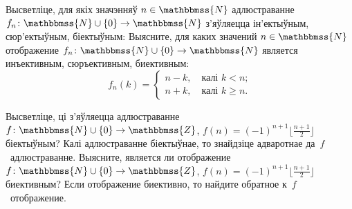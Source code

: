 \begin{problemList}
\bigskip

\problemItemWithCommonPart
{Высветліце, для якіх значэнняў $n \in \mathbbmss{N}$ адлюстраванне
$f_n \colon \mathbbmss{N} \cup \{0\} \to \mathbbmss{N}$ з'яўляецца ін'ектыўным, сюр'ектыўным, біектыўным:}
{Выясните, для каких значений $n \in \mathbbmss{N}$ отображение
$f_n \colon \mathbbmss{N} \cup \{0\} \to \mathbbmss{N}$ является инъективным, сюръективным, биективным:}
{%
\begin{equation*}
    f_n(k) =
    \begin{cases}
    n - k, \quad \text{калі $k < n$;} \\
    n + k, \quad \text{калі $k \ge n$.}
    \end{cases}
\end{equation*}
}

\medskip

\problemItemSimple
{Высветліце, ці з'яўляецца адлюстраванне
$f \colon \mathbbmss{N} \cup \{0\} \to \mathbbmss{Z}$, $f(n) = (-1)^{n + 1}\bigl\lfloor\frac{n + 1}{2}\bigr\rfloor$
біектыўным? Калі адлюстраванне біектыўнае, то знайдзіце адваротнае да~$f$~адлюстраванне.}
{Выясните, является ли отображение
$f \colon \mathbbmss{N} \cup \{0\} \to \mathbbmss{Z}$, $f(n) = (-1)^{n + 1}\bigl\lfloor\frac{n + 1}{2}\bigr\rfloor$
биективным? Если отображение биективно, то найдите обратное к~$f$~отображение.}

\newpage


\end{problemList}

